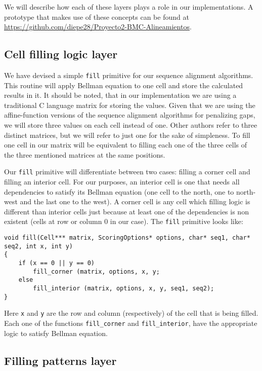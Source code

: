 \documentclass[journal]{IEEEtran}
\begin{document}
We will describe how each of these layers plays a role in our implementations. A prototype that makes use of these concepts can be found at \url{https://github.com/diepe28/Proyecto2-BMC-Alineamientos}.

\subsection{Cell filling logic layer}

We have devised a simple {\tt fill} primitive for our sequence alignment algorithms. This routine will apply Bellman equation to one cell and store the calculated results in it. It should be noted, that in our implementation we are using a traditional C language matrix for storing the values. Given that we are using the affine-function versions of the sequence alignment algorithms for penalizing gaps, we will store three values on each cell instead of one. Other authors refer to three distinct matrices, but we will refer to just one for the sake of simpleness. To fill one cell in our matrix will be equivalent to filling each one of the three cells of the three mentioned matrices at the same positions.

Our {\tt fill} primitive will differentiate between two cases: filling a corner cell and filling an interior cell. For our purposes, an interior cell is one that needs all dependencies to satisfy its Bellman equation (one cell to the north, one to north-west and the last one to the west). A corner cell is any cell which filling logic is different than interior cells just because at least one of the dependencies is non existent (cells at row or column $0$ in our case). The  {\tt fill} primitive looks like:


\lstset{language=C}
\begin{lstlisting}[linewidth=\columnwidth,breaklines=true]
void fill(Cell*** matrix, ScoringOptions* options, char* seq1, char* seq2, int x, int y) 
{
	if (x == 0 || y == 0)
		fill_corner (matrix, options, x, y;
	else
		fill_interior (matrix, options, x, y, seq1, seq2);
}
\end{lstlisting}

Here {\tt x} and {\tt y} are the row and column (respectively) of the cell that is being filled. Each one of the functions {\tt fill\_corner} and {\tt fill\_interior}, have the appropriate logic to satisfy Bellman equation. 

\subsection{Filling patterns layer}
\end{document}
